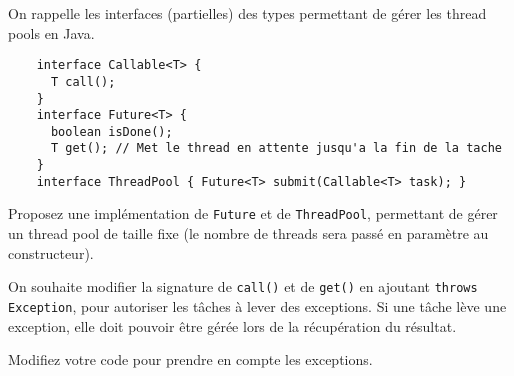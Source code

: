 
\begingroup

\begin{exercice}
  \label{exo:monitors/threadpool}

  On rappelle les interfaces (partielles) des types permettant de gérer les thread pools en Java.
  \begin{lstlisting}
    interface Callable<T> {
      T call();
    }
    interface Future<T> {
      boolean isDone();
      T get(); // Met le thread en attente jusqu'a la fin de la tache
    }
    interface ThreadPool { Future<T> submit(Callable<T> task); }
  \end{lstlisting}

  \begin{question}
  \item Proposez une implémentation de \lstinline{Future} et de \lstinline{ThreadPool}, permettant de gérer un thread pool de taille fixe (le nombre de threads sera passé en paramètre au constructeur).  
  \end{question}
  On souhaite modifier la signature de \lstinline{call()} et de \lstinline{get()} en ajoutant \lstinline{throws Exception},
  pour autoriser les tâches à lever des exceptions. Si une tâche lève une exception, elle doit pouvoir être gérée lors de la récupération du résultat.
  \begin{question}
  \item Modifiez votre code pour prendre en compte les exceptions.
  \end{question}
  
\end{exercice}

\endgroup
\endinput
